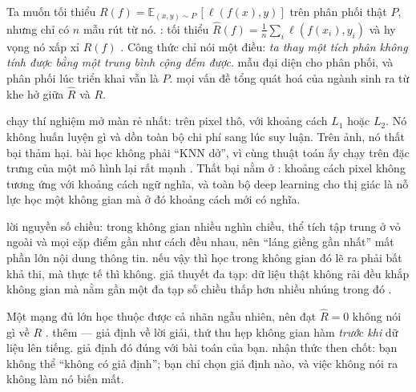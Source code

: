 \documentclass[../../deep_learning.tex]{subfiles}
\begin{document}
\begin{mach}
\item {} Ta muốn tối thiểu  \(R(f)=\mathbb{E}_{(x,y)\sim P}\,[\ell(f(x),y)]\) trên phân phối thật \(P\), nhưng chỉ có \(n\) mẫu rút từ nó. \gp {}: tối thiểu \(\hat{R}(f)=\tfrac{1}{n}\sum_i \ell(f(x_i),y_i)\) và hy vọng nó xấp xỉ \(R(f)\) \cite{vapnik1999}. Công thức chỉ nói một điều: \emph{ta thay một tích phân không tính được bằng một trung bình cộng đếm được}. \gd mẫu đại diện cho phân phối, và phân phối lúc triển khai vẫn là \(P\). \gia mọi vấn đề tổng quát hoá của ngành sinh ra từ khe hở giữa \(\hat{R}\) và \(R\). 
\item {} \gp chạy thí nghiệm mở màn rẻ nhất:  trên pixel thô, với khoảng cách \(L_1\) hoặc \(L_2\). Nó không huấn luyện gì và dồn toàn bộ chi phí sang lúc suy luận. Trên ảnh, nó thất bại thảm hại. \hq bài học không phải ``KNN dở'', vì cùng thuật toán ấy chạy trên đặc trưng của một mô hình  lại rất mạnh \cite{caron2021dino,oquab2024dinov2}. Thất bại nằm ở : khoảng cách pixel không tương ứng với khoảng cách ngữ nghĩa, và toàn bộ deep learning cho thị giác là nỗ lực học một không gian mà ở đó khoảng cách mới có nghĩa.
\item {} \gp lời nguyền số chiều: trong không gian nhiều nghìn chiều, thể tích tập trung ở vỏ ngoài và mọi cặp điểm gần như cách đều nhau, nên ``láng giềng gần nhất'' mất phần lớn nội dung thông tin. \vdm nếu vậy thì học trong không gian đó lẽ ra phải bất khả thi, mà thực tế thì không. \gp giả thuyết đa tạp: dữ liệu thật không rải đều khắp không gian mà nằm gần một đa tạp số chiều thấp hơn nhiều nhúng trong đó \cite{goodfellow2016}.
\item {} Một mạng đủ lớn học thuộc được cả nhãn ngẫu nhiên, nên đạt \(\hat{R}=0\) không nói gì về \(R\) \cite{zhang2017rethinking}. \gp thêm  --- giả định về lời giải, thứ thu hẹp không gian hàm \emph{trước khi} dữ liệu lên tiếng. \gd giả định đó đúng với bài toán của bạn. \hq nhận thức then chốt: bạn không thể ``không có giả định''; bạn chỉ chọn giả định nào, và việc không nói ra không làm nó biến mất.

\end{mach}
\end{document}
